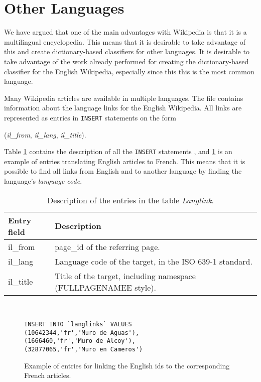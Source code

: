 \section{Other Languages}
We have argued that one of the main advantages with Wikipedia is that it is a multilingual encyclopedia. This means that it is desirable to take advantage of this and create dictionary-based classifiers for other languages. It is desirable to take advantage of the work already performed for creating the dictionary-based classifier for the English Wikipedia, especially since this this is the most common language.


Many Wikipedia articles are available in multiple languages. The file \enwikilanglinks contains information about the language links for the English Wikipedia. All links are represented as entries in \texttt{INSERT} statements on the form  
\begin{center}
(\emph{il\_from}, \emph{il\_lang}, \emph{il\_title}).
\end{center}

Table \ref{tab:langlinkdesc} contains the description of all the \texttt{INSERT} statements  \cite{wiki:langlinks}, and \ref{fig:langlinkexample} is an example of entries translating English articles to French. This means that it is possible to find all links from English and to another language by finding the language's \emph{language code}. 

\begin{table}[ht]
\renewcommand{\arraystretch}{1.25}
\begin{tabularx}{\textwidth}{l|X}
\textbf{Entry field} &  \textbf{Description} \\ \hline
 il\_from & page\_id of the referring page.\\ \hline
 il\_lang & Language code of the target, in the ISO 639-1 standard. \\  \hline
 il\_title & Title of the target, including namespace 
 (FULLPAGENAMEE style).
\end{tabularx}
\\[10pt]
\caption[Description of the entry fields in the table \emph{Langlink}]{Description of the entries in the table \emph{Langlink}.}
\label{tab:langlinkdesc}
\end{table}

\begin{figure}[h]
\centering
\begin{lstlisting}
INSERT INTO `langlinks` VALUES 
(10642344,'fr','Muro de Aguas'),
(1666460,'fr','Muro de Alcoy'),
(32877065,'fr','Muro en Cameros')
\end{lstlisting}
\caption[Example of langlink \texttt{INSERT} statement]{Example of entries for linking the English ids to the corresponding French articles.}
\label{fig:langlinkexample}
\end{figure}
